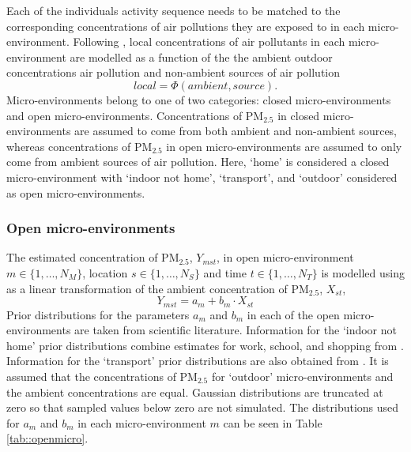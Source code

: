 \documentclass{article}
\begin{document}

Each of the individuals activity sequence needs to be matched to the corresponding concentrations of air pollutions they are exposed to in each micro-environment. Following \citet{zidek2007framework}, local concentrations of air pollutants in each micro-environment are modelled as a function of the the ambient outdoor concentrations air pollution and non-ambient sources of air pollution
\begin{equation*}
	local = \Phi(ambient, source). 
\end{equation*}
Micro-environments belong to one of two categories: closed micro-environments and open micro-environments. Concentrations of PM$_{2.5}$ in closed micro-environments are assumed to come from both ambient and non-ambient sources, whereas concentrations of PM$_{2.5}$ in open micro-environments are assumed to only come from ambient sources of air pollution. Here, `home' is considered a closed micro-environment with `indoor not home', `transport', and `outdoor' considered as open micro-environments.  

\clearpage
\subsubsection{Open micro-environments}


The estimated concentration of PM$_{2.5}$, $Y_{mst}$, in open micro-environment $m \in \{1, \ldots, N_M\}$, location $s\in \{1, \ldots, N_S\}$ and time $t\in \{1, \ldots, N_T\}$ is modelled using as a linear transformation of the ambient concentration of PM$_{2.5}$, $X_{st}$, 
\begin{equation*}
	Y_{mst} = a_m + b_m\cdot X_{st}
\end{equation*}
Prior distributions for the parameters $a_m$ and $b_m$ in each of the open micro-environments are taken from scientific literature. Information for the `indoor not home' prior distributions combine estimates for work, school, and shopping from \citet{burke2001population}. Information for the `transport' prior distributions are also obtained from \citet{burke2001population}. It is assumed that the concentrations of PM$_{2.5}$ for `outdoor' micro-environments and the ambient concentrations are equal. Gaussian distributions are truncated at zero so that sampled values below zero are not simulated. The distributions used for $a_m$ and $b_m$ in each micro-environment $m$ can be seen in Table \ref{tab::openmicro}.
\end{document}
